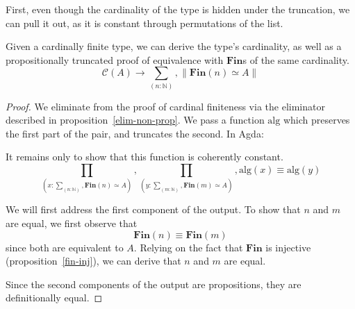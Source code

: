 First, even though the cardinality of the type is hidden under the truncation,
we can pull it out, as it is constant through permutations of the list.
\begin{theorem}
  Given a cardinally finite type, we can derive the type's cardinality, as well
  as a propositionally truncated proof of equivalence with \(\textbf{Fin}\)s of
  the same cardinality.
  \begin{equation}
    \mathcal{C}(A) \rightarrow \sum_{(n : \mathbb{N})} , \lVert \textbf{Fin}(n) \simeq A \rVert
  \end{equation}
\end{theorem}
\begin{proof}
  We eliminate from the proof of cardinal finiteness via the eliminator
  described in proposition~\ref{elim-non-prop}.
  We pass a function \(\text{alg}\) which preserves the first part of the pair,
  and truncates the second.
  In Agda:

  It remains only to show that this function is coherently constant.
  \begin{equation}
    \prod_{(x : \sum_{(n : \mathbb{N})} , \textbf{Fin}(n) \simeq A)} ,
    \prod_{(y : \sum_{(m : \mathbb{N})} , \textbf{Fin}(m) \simeq A)} ,
    \text{alg}(x) \equiv \text{alg}(y)
  \end{equation}

  We will first address the first component of the output.
  To show that \(n\) and \(m\) are equal, we first observe that
  \begin{equation}
    \textbf{Fin}(n) \equiv \textbf{Fin}(m)
  \end{equation}
  since both are equivalent to \(A\).
  Relying on the fact that \(\textbf{Fin}\) is injective
  (proposition~\ref{fin-inj}), we can derive that \(n\) and \(m\) are equal.

  Since the second components of the output are propositions, they are
  definitionally equal.
\end{proof}

